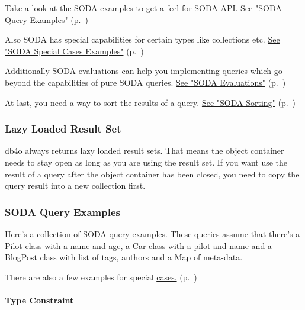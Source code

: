 Take a look at the SODA-examples to get a feel for SODA-API. \hyperref[ref:basics-querying-soda-soda-example-catelog]{See "SODA Query Examples"} (p.~\pageref{ref:basics-querying-soda-soda-example-catelog})

Also SODA has special capabilities for certain types like collections etc. \hyperref[ref:basics-querying-soda-soda-special-case-examples]{See "SODA Special Cases Examples"} (p.~\pageref{ref:basics-querying-soda-soda-special-case-examples})

Additionally SODA evaluations can help you implementing queries which go beyond the capabilities of pure SODA queries. \hyperref[ref:basics-querying-soda-soda-evaluations]{See "SODA Evaluations"} (p.~\pageref{ref:basics-querying-soda-soda-evaluations})

At last, you need a way to sort the results of a query. \hyperref[ref:basics-querying-soda-soda-sorting]{See "SODA Sorting"} (p.~\pageref{ref:basics-querying-soda-soda-sorting})

\subsubsection*{Lazy Loaded Result Set}

db4o always returns lazy loaded result sets. That means the object container needs to stay open as long as you are using the result set. If you want use the result of a query after the object container has been closed, you need to copy the query result into a new collection first.

\subsubsection{SODA Query Examples}
\label{ref:basics-querying-soda-soda-example-catelog}

Here's a collection of SODA-query examples. These queries assume that there's a Pilot class with a name and age, a Car class with a pilot and name and a BlogPost class with list of tags, authors and a Map of meta-data.

There are also a few examples for special \hyperref[ref:basics-querying-soda-soda-special-case-examples]{cases.} (p.~\pageref{ref:basics-querying-soda-soda-special-case-examples})

\paragraph{Type Constraint}
\label{ref:basics-querying-soda-soda-example-catelog:typeconstraint}

